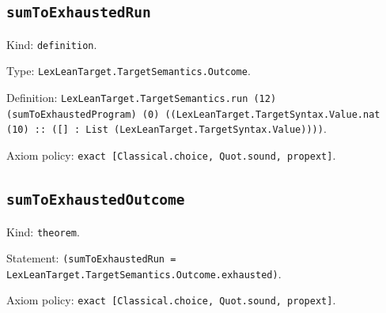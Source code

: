 \documentclass[11pt]{article}
\begin{document}
\subsection*{\texttt{sumToExhaustedRun}}
\noindent Kind: \texttt{definition}.\par
\noindent Type: \texttt{LexLeanTarget.TargetSemantics.Outcome}.\par
\noindent Definition: \texttt{LexLeanTarget.TargetSemantics.run (12) (sumToExhaustedProgram) (0) ((LexLeanTarget.TargetSyntax.Value.nat (10) :: ([] : List (LexLeanTarget.TargetSyntax.Value))))}.\par
\noindent Axiom policy: \texttt{exact [Classical.choice, Quot.sound, propext]}.\par
\subsection*{\texttt{sumToExhaustedOutcome}}
\noindent Kind: \texttt{theorem}.\par
\noindent Statement: \texttt{(sumToExhaustedRun = LexLeanTarget.TargetSemantics.Outcome.exhausted)}.\par
\noindent Axiom policy: \texttt{exact [Classical.choice, Quot.sound, propext]}.\par
\end{document}
